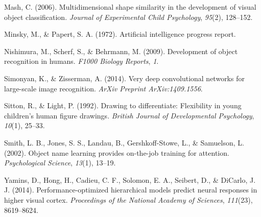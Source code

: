 \documentclass[10pt, letterpaper]{article}
\begin{document}
\hypertarget{ref-mash2006}{}
Mash, C. (2006). Multidimensional shape similarity in the development of
visual object classification. \emph{Journal of Experimental Child
Psychology}, \emph{95}(2), 128--152.

\hypertarget{ref-minsky1972artificial}{}
Minsky, M., \& Papert, S. A. (1972). Artificial intelligence progress
report.

\hypertarget{ref-nishimura2009}{}
Nishimura, M., Scherf, S., \& Behrmann, M. (2009). Development of object
recognition in humans. \emph{F1000 Biology Reports}, \emph{1}.

\hypertarget{ref-simonyan2014very}{}
Simonyan, K., \& Zisserman, A. (2014). Very deep convolutional networks
for large-scale image recognition. \emph{ArXiv Preprint
ArXiv:1409.1556}.

\hypertarget{ref-sitton1992drawing}{}
Sitton, R., \& Light, P. (1992). Drawing to differentiate: Flexibility
in young children's human figure drawings. \emph{British Journal of
Developmental Psychology}, \emph{10}(1), 25--33.

\hypertarget{ref-smith2002object}{}
Smith, L. B., Jones, S. S., Landau, B., Gershkoff-Stowe, L., \&
Samuelson, L. (2002). Object name learning provides on-the-job training
for attention. \emph{Psychological Science}, \emph{13}(1), 13--19.

\hypertarget{ref-yamins2014performance}{}
Yamins, D., Hong, H., Cadieu, C. F., Solomon, E. A., Seibert, D., \&
DiCarlo, J. J. (2014). Performance-optimized hierarchical models predict
neural responses in higher visual cortex. \emph{Proceedings of the
National Academy of Sciences}, \emph{111}(23), 8619--8624.
\end{document}
